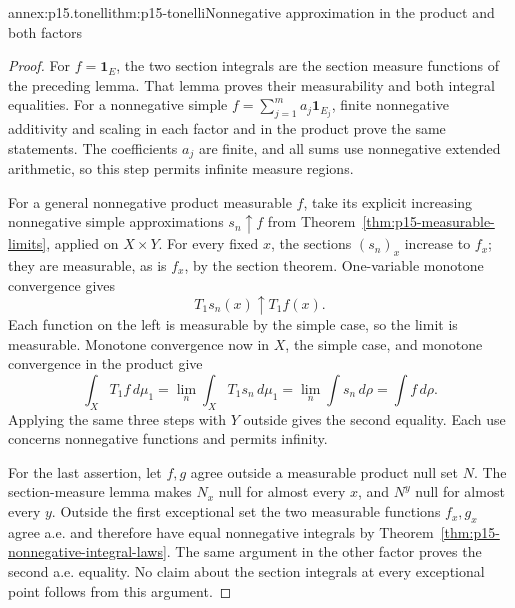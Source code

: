 \begin{annexitem}{annex:p15.tonelli}{thm:p15-tonelli}{Nonnegative approximation in the product and both factors}
\begin{proof}
For \(f=\mathbf1_E\), the two section integrals are the section
measure functions of the preceding lemma. That lemma proves their
measurability and both integral equalities. For a nonnegative simple
\(f=\sum_{j=1}^m a_j\mathbf1_{E_j}\), finite nonnegative additivity
and scaling in each factor and in the product prove the same statements.
The coefficients \(a_j\) are finite, and all sums use nonnegative
extended arithmetic, so this step permits infinite measure regions.

For a general nonnegative product measurable \(f\), take its explicit
increasing nonnegative simple approximations \(s_n\uparrow f\) from
Theorem~\ref{thm:p15-measurable-limits}, applied on \(X\times Y\).
For every fixed \(x\), the sections \((s_n)_x\) increase to
\(f_x\); they are measurable, as is \(f_x\), by the section
theorem. One-variable monotone convergence gives
\[
 T_1s_n(x)\uparrow T_1f(x).
\]
Each function on the left is measurable by the simple case, so the
limit is measurable. Monotone convergence now in \(X\), the simple
case, and monotone convergence in the product give
\[
 \int_X T_1f\,d\mu_1
   =\lim_n\int_X T_1s_n\,d\mu_1
   =\lim_n\int s_n\,d\rho
   =\int f\,d\rho.
\]
Applying the same three steps with \(Y\) outside gives the second
equality. Each use concerns nonnegative functions and permits infinity.

For the last assertion, let \(f,g\) agree outside a measurable product
null set \(N\). The section-measure lemma makes \(N_x\) null for
almost every \(x\), and \(N^y\) null for almost every \(y\).
Outside the first exceptional set the two measurable functions
\(f_x,g_x\) agree a.e. and therefore have equal nonnegative integrals
by Theorem~\ref{thm:p15-nonnegative-integral-laws}. The same argument
in the other factor proves the second a.e. equality. No claim about
the section integrals at every exceptional point follows from this argument.
\end{proof}
\end{annexitem}

